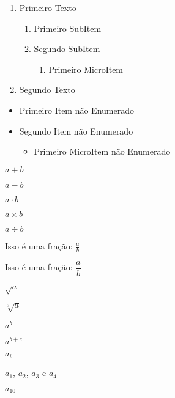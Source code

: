\documentclass[a4paper]{article}
\begin{document}

\begin{enumerate}

\item Primeiro Texto
	\begin{enumerate}

	\item Primeiro SubItem
	\item Segundo SubItem
	\begin{enumerate}
		\item Primeiro MicroItem
	\end{enumerate}
	
	\end{enumerate}

\item Segundo Texto

\end{enumerate}

\begin{itemize}
	\item Primeiro Item não Enumerado
	\item Segundo Item não Enumerado
	\begin{itemize}
		\item Primeiro MicroItem não Enumerado
	\end{itemize}
\end{itemize}


$ a + b $

$ a - b $

$ a\cdot b $

$ a\times b $

$ a\div b $

Isso é uma fração: $ \frac{a}{b} $

Isso é uma fração: $ \dfrac{a}{b} $

$ \sqrt{a} $

$ \sqrt[3]{a} $

$ a^b $

$ a ^ {b+c} $

$ a_i $

$ a_1 $, $ a_2 $, $ a_3 $ e $ a_4 $

$ a_{10} $
\end{document}
